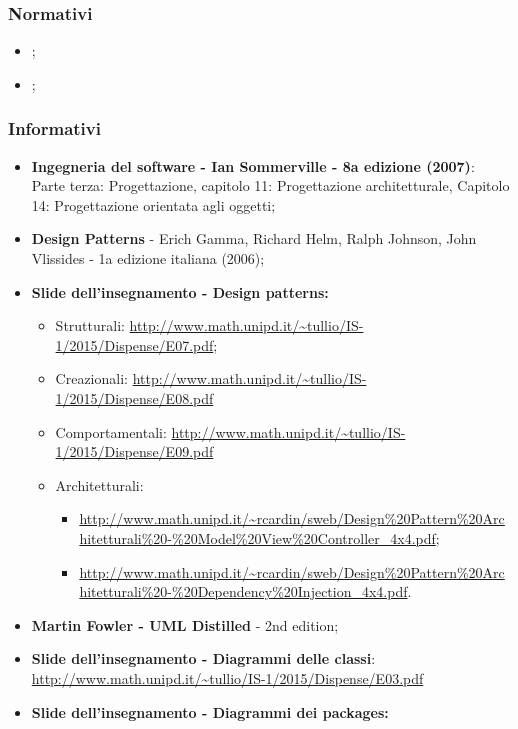 \subsubsection{Normativi}
\begin{itemize}
	\item \textit{\NdPvDue};
	\item \textit{\AdRvDue};
\end{itemize}
\subsubsection{Informativi}
\begin{itemize}
	\item \textbf{Ingegneria del software - Ian Sommerville - 8a edizione (2007)}: \\
	Parte terza: Progettazione, capitolo 11: Progettazione architetturale, Capitolo 14: Progettazione orientata agli oggetti;
	\item \textbf{Design Patterns} - Erich Gamma, Richard Helm, Ralph Johnson, John Vlissides - 1a edizione italiana (2006);
	\item \textbf{Slide dell'insegnamento - Design patterns:}
	\begin{itemize}
		\item Strutturali: \url{http://www.math.unipd.it/~tullio/IS-1/2015/Dispense/E07.pdf};
		\item Creazionali: \url{http://www.math.unipd.it/~tullio/IS-1/2015/Dispense/E08.pdf}
		\item Comportamentali: \url{http://www.math.unipd.it/~tullio/IS-1/2015/Dispense/E09.pdf}
		\item Architetturali:
			\begin{itemize}
				\item \url{http://www.math.unipd.it/~rcardin/sweb/Design%20Pattern%20Architetturali%20-%20Model%20View%20Controller_4x4.pdf};
				\item \url{http://www.math.unipd.it/~rcardin/sweb/Design%20Pattern%20Architetturali%20-%20Dependency%20Injection_4x4.pdf}.
			\end{itemize} 
	\end{itemize}
	\item \textbf{Martin Fowler - UML Distilled} - 2nd edition;
	\item \textbf{Slide dell'insegnamento - Diagrammi delle classi}: \\
		\url{http://www.math.unipd.it/~tullio/IS-1/2015/Dispense/E03.pdf}
	\item \textbf{Slide dell'insegnamento - Diagrammi dei packages:} \\

\end{itemize}
